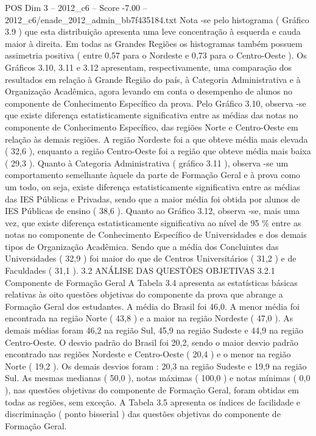 \begin{textsample}{POS Dim 3 – 2012\_c6 – Score -7.00 – 2012\_c6/enade\_2012\_admin\_bb7f435184.txt}
Nota -se pelo histograma ( Gráfico 3.9 ) que esta distribuição apresenta uma leve concentração à esquerda e cauda maior à direita.
Em todas as Grandes Regiões os histogramas também possuem assimetria positiva ( entre 0,57 para o Nordeste e 0,73 para o Centro-Oeste ).
Os Gráficos 3.10, 3.11 e 3.12 apresentam, respectivamente, uma comparação dos resultados em relação à Grande Região do país, à Categoria Administrativa e à Organização Acadêmica, agora levando em conta o desempenho de alunos no componente de Conhecimento Específico da prova.
Pelo Gráfico 3.10, observa -se que existe diferença estatisticamente significativa entre as médias das notas no componente de Conhecimento Específico, das regiões Norte e Centro-Oeste em relação às demais regiões.
A região Nordeste foi a que obteve média mais elevada ( 32,6 ), enquanto a região Centro-Oeste foi a região que obteve média mais baixa ( 29,3 ).
Quanto à Categoria Administrativa ( gráfico 3.11 ), observa -se um comportamento semelhante àquele da parte de Formação Geral e à prova como um todo, ou seja, existe diferença estatisticamente significativa entre as médias das IES Públicas e Privadas, sendo que a maior média foi obtida por alunos de IES Públicas de ensino ( 38,6 ).
Quanto ao Gráfico 3.12, observa -se, mais uma vez, que existe diferença estatisticamente significativa ao nível de 95 \% entre as notas no componente de Conhecimento Específico de Universidades e dos demais tipos de Organização Acadêmica.
Sendo que a média dos Concluintes das Universidades ( 32,9 ) foi maior do que de Centros Universitários ( 31,2 ) e de Faculdades ( 31,1 ). 3.2 ANÁLISE DAS QUESTÕES OBJETIVAS 3.2.1 Componente de Formação Geral A Tabela 3.4 apresenta as estatísticas básicas relativas às oito questões objetivas do componente da prova que abrange a Formação Geral dos estudantes.
A média do Brasil foi 46,0.
A menor média foi encontrada na região Norte ( 43,8 ) e a maior na região Nordeste ( 47,0 ).
As demais médias foram 46,2 na região Sul, 45,9 na região Sudeste e 44,9 na região Centro-Oeste.
O desvio padrão do Brasil foi 20,2, sendo o maior desvio padrão encontrado nas regiões Nordeste e Centro-Oeste ( 20,4 ) e o menor na região Norte ( 19,2 ).
Os demais desvios foram : 20,3 na região Sudeste e 19,9 na região Sul.
As mesmas medianas ( 50,0 ), notas máximas ( 100,0 ) e notas mínimas ( 0,0 ), nas questões objetivas do componente de Formação Geral, foram obtidas em todas as regiões, sem exceção.
A Tabela 3.5 apresenta os índices de facilidade e discriminação ( ponto bisserial ) das questões objetivas do componente de Formação Geral.

\end{textsample}
